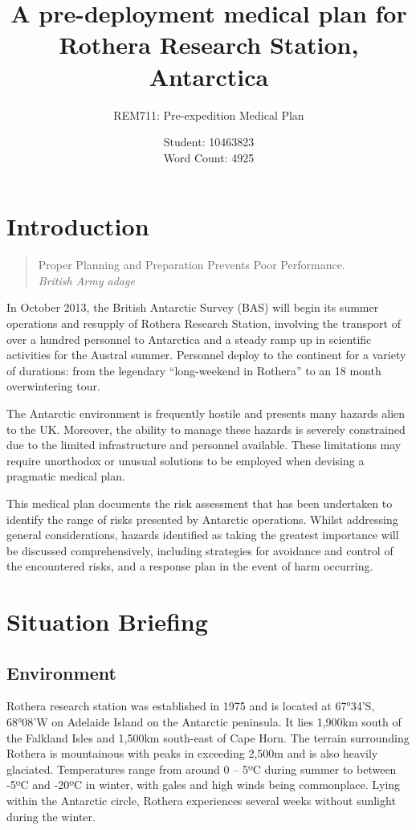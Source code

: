 \documentclass[12pt,a4paper]{article}
\title{A pre-deployment medical plan for Rothera Research Station, Antarctica}
\author{REM711: Pre-expedition Medical Plan}
\date{Student: 10463823 \\ Word Count: 4925}
\begin{document}
\maketitle

\tableofcontents

\pagebreak

\section{Introduction}

\begin{quote}
Proper Planning and Preparation Prevents Poor Performance. \\
\em British Army adage
\end{quote}

In October 2013, the British Antarctic Survey (BAS) will begin its summer operations and resupply of Rothera Research Station, involving the transport of over a hundred personnel to Antarctica and a steady ramp up in scientific activities for the Austral summer. Personnel deploy to the continent for a variety of durations: from the legendary ``long-weekend in Rothera'' to an 18 month overwintering tour.

The Antarctic environment is frequently hostile and presents many hazards alien to the UK. Moreover, the ability to manage these hazards is severely constrained due to the limited infrastructure and personnel available. These limitations may require unorthodox or unusual solutions to be employed when devising a pragmatic medical plan.

This medical plan documents the risk assessment that has been undertaken to identify the range of risks presented by Antarctic operations. Whilst addressing general considerations, hazards identified as taking the greatest importance will be discussed comprehensively, including strategies for avoidance and control of the encountered risks, and a response plan in the event of harm occurring.

\section{Situation Briefing}

\subsection{Environment}

Rothera research station was established in 1975 and is located at 67°34'S, 68°08'W on Adelaide Island on the Antarctic peninsula. It lies 1,900km south of the Falkland Isles and 1,500km south-east of Cape Horn. The terrain surrounding Rothera is mountainous with peaks in exceeding 2,500m and is also heavily glaciated. Temperatures range from around 0 -- 5ºC during summer to between -5ºC and -20ºC in winter, with gales and high winds being commonplace. Lying within the Antarctic circle, Rothera experiences several weeks without sunlight during the winter.
\end{document}
